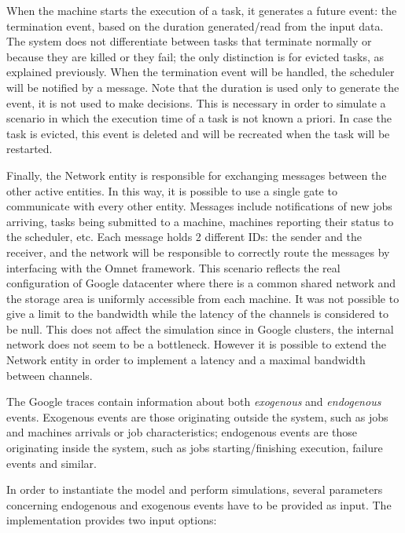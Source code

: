 \documentclass{article}
\begin{document}
When the machine starts the execution of a task, it generates a future event: the termination event, based on the duration generated/read from the input data. The system does not differentiate between tasks that terminate normally or because they are killed or they fail; the only distinction is for evicted tasks, as explained previously. When the termination event will be handled, the scheduler will be notified by a message. Note that the duration is used only to generate the event, it is not used to make decisions. This is necessary in order to simulate a scenario in which the execution time of a task is not known a priori. In case the task is evicted, this event is deleted and will be recreated when the task will be restarted. 

Finally, the Network entity is responsible for exchanging messages between the other active entities.  In this way, it is possible to use a single gate to communicate with every other entity. Messages include notifications of new jobs arriving, tasks being submitted to a machine, machines reporting their status to the scheduler, etc.  Each message holds 2 different IDs: the sender and the receiver, and the network will be responsible to correctly route the messages by interfacing with the Omnet framework. This scenario reflects the real configuration of Google datacenter where there is a common shared network and the storage area is uniformly accessible from each machine. It was not possible to give a limit to the bandwidth while the latency of the channels is considered to be null. This does not affect the simulation since in Google clusters, the internal network does not seem to be a bottleneck. However it is possible to extend the Network entity in order to implement a latency and a maximal bandwidth between channels.

The Google traces contain information about both \emph{exogenous} and \emph{endogenous} events. Exogenous events are those originating outside the system, such as jobs and machines arrivals or job characteristics; endogenous events are those originating inside the system, such as jobs starting/finishing execution, failure events and similar.

In order to instantiate the model and perform simulations, several parameters concerning endogenous and exogenous events 
have to be provided as input. The implementation provides two input options:
\end{document}
